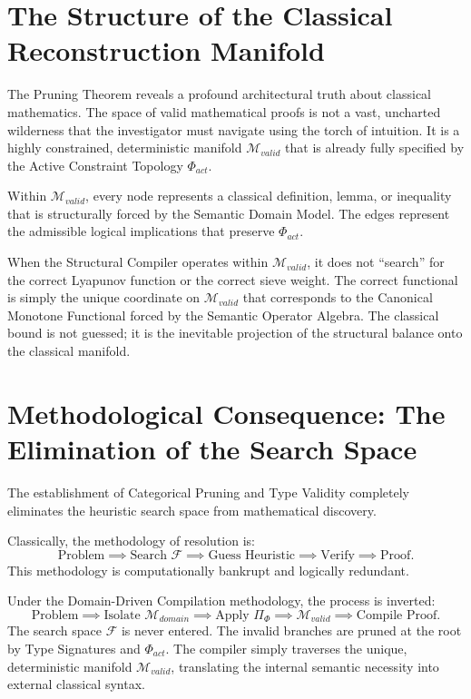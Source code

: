 \documentclass[12pt,openany]{extbook}
\theoremstyle{plain}
\theoremstyle{definition}
\begin{document}
\section{The Structure of the Classical Reconstruction Manifold}

The Pruning Theorem reveals a profound architectural truth about classical mathematics. The space of valid mathematical proofs is not a vast, uncharted wilderness that the investigator must navigate using the torch of intuition. It is a highly constrained, deterministic manifold $\mathcal{M}_{valid}$ that is already fully specified by the Active Constraint Topology $\Phi_{act}$.

Within $\mathcal{M}_{valid}$, every node represents a classical definition, lemma, or inequality that is structurally forced by the Semantic Domain Model. The edges represent the admissible logical implications that preserve $\Phi_{act}$. 

When the Structural Compiler operates within $\mathcal{M}_{valid}$, it does not ``search'' for the correct Lyapunov function or the correct sieve weight. The correct functional is simply the unique coordinate on $\mathcal{M}_{valid}$ that corresponds to the Canonical Monotone Functional forced by the Semantic Operator Algebra. The classical bound is not guessed; it is the inevitable projection of the structural balance onto the classical manifold.

\section{Methodological Consequence: The Elimination of the Search Space}

The establishment of Categorical Pruning and Type Validity completely eliminates the heuristic search space from mathematical discovery.

Classically, the methodology of resolution is:
\[
\text{Problem} \implies \text{Search } \mathcal{F} \implies \text{Guess Heuristic} \implies \text{Verify} \implies \text{Proof}.
\]
This methodology is computationally bankrupt and logically redundant.

Under the Domain-Driven Compilation methodology, the process is inverted:
\[
\text{Problem} \implies \text{Isolate } \mathcal{M}_{domain} \implies \text{Apply } \Pi_{\Phi} \implies \mathcal{M}_{valid} \implies \text{Compile Proof}.
\]
The search space $\mathcal{F}$ is never entered. The invalid branches are pruned at the root by Type Signatures and $\Phi_{act}$. The compiler simply traverses the unique, deterministic manifold $\mathcal{M}_{valid}$, translating the internal semantic necessity into external classical syntax.
\end{document}
